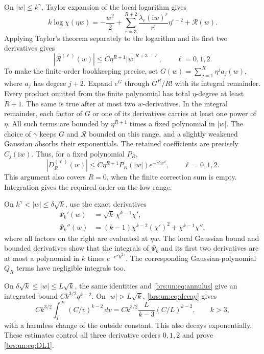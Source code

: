 \documentclass[11pt]{article}
\numberwithin{equation}{section}
\theoremstyle{remark}\newtheorem{remark}[theorem]{Remark}
\newcommand{\ii}{\mathrm i}\newcommand{\sgn}{\operatorname{sgn}}
\begin{document}
On $|w|\le k^\gamma$, Taylor expansion of the local logarithm gives
\begin{equation}\label{brs:un:eq:logchi}
 k\log\chi(\eta w)=-\frac{w^2}{2}
  +\sum_{r=3}^{R+2}\frac{\lambda_r(\ii w)^r}{r!}\eta^{r-2}
  +\mathcal R(w).
\end{equation}
Applying Taylor's theorem separately to the logarithm and its first
two derivatives gives
\begin{equation}\label{brs:un:eq:remder}
 |\mathcal R^{(\ell)}(w)|
 \le C\eta^{R+1}|w|^{R+3-\ell},\qquad \ell=0,1,2.
\end{equation}
To make the finite-order bookkeeping precise, set
$G(w)=\sum_{j=1}^R\eta^j a_j(w)$, where $a_j$ has degree $j+2$.
Expand $e^G$ through $G^R/R!$ with its integral remainder.
Every product omitted from the finite polynomial has total
$\eta$-degree at least $R+1$.  The same is true after at most two
$w$-derivatives.  In the integral remainder, each factor of $G$ or
one of its derivatives carries at least one power of $\eta$.
All such terms are bounded by $\eta^{R+1}$ times a fixed polynomial
in $|w|$.  The choice of $\gamma$ keeps $G$ and $\mathcal R$ bounded
on this range, and a slightly weakened Gaussian absorbs their
exponentials.  The retained coefficients are precisely
$C_j(\ii w)$.  Thus, for a fixed polynomial $P_R$,
\begin{equation}\label{brs:un:eq:low}
 |D_R^{(\ell)}(w)|
 \le C\eta^{R+1}P_R(|w|)e^{-c'w^2},\qquad \ell=0,1,2.
\end{equation}
This argument also covers $R=0$, when the finite correction sum is
empty.  Integration gives the required order on the low range.

On $k^\gamma<|w|\le\delta\sqrt k$, use the exact derivatives
\begin{align}\label{brs:un:eq:psider}
 \Psi_k'(w)&=\sqrt k\,\chi^{k-1}\chi',\\
 \Psi_k''(w)&=(k-1)\chi^{k-2}(\chi')^2+\chi^{k-1}\chi'',\nonumber
\end{align}
where all factors on the right are evaluated at $\eta w$.
The local Gaussian bound and bounded derivatives show that the
integrals of $\Psi_k$ and its first two derivatives are at most a
polynomial in $k$ times $e^{-c''k^{2\gamma}}$.  The corresponding
Gaussian-polynomial $Q_R$ terms have negligible integrals too.

On $\delta\sqrt k\le|w|\le L\sqrt k$, the same identities and
\eqref{brs:un:eq:annulus} give an integrated bound
$Ck^{3/2}q^{k-2}$.  On $|w|>L\sqrt k$, \eqref{brs:un:eq:decay} gives
\begin{equation}\label{brs:un:eq:outer}
 Ck^{3/2}\int_L^\infty(C/v)^{k-2}\,dv
 =Ck^{3/2}\frac{L}{k-3}(C/L)^{k-2},\qquad k>3,
\end{equation}
with a harmless change of the outside constant.  This also decays
exponentially.  These estimates control all three derivative orders
$0,1,2$ and prove \eqref{brs:un:eq:DL1}.
\end{document}
